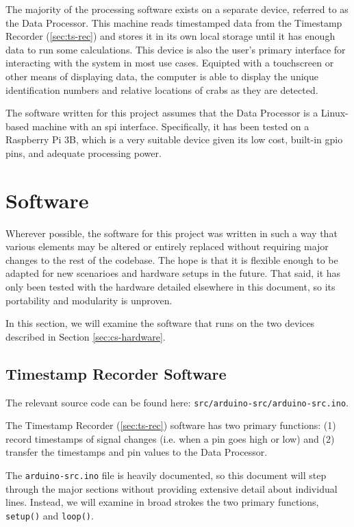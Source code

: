 \documentclass[12pt]{article}
\begin{document}
The majority of the processing software exists on a separate device, referred
to as the Data Processor.
This machine reads timestamped data from the
Timestamp Recorder (\ref{sec:ts-rec}) and stores it in its own local storage
until it has enough data to run some calculations.
This device is also the user's primary interface for interacting with the
system in most use cases.
Equipted with a touchscreen or other means of displaying data, the computer is
able to display the unique identification numbers and relative locations of
crabs as they are detected.

The software written for this project assumes that the Data Processor is a
Linux-based machine with an \gls{spi} interface.
Specifically, it has been tested on a Raspberry Pi 3B, which is a very
suitable device given its low cost, built-in \gls{gpio} pins, and adequate
processing power.

\section{Software}\label{sec:software}

Wherever possible, the software for this project was written in such a way that
various elements may be altered or entirely replaced without requiring major
changes to the rest of the codebase.
The hope is that it is flexible enough to be adapted for new scenarioes and
hardware setups in the future.
That said, it has only been tested with the hardware detailed elsewhere in this
document, so its portability and modularity is unproven.

In this section, we will examine the software that runs on the two devices
described in Section \ref{sec:cs-hardware}.

\subsection{Timestamp Recorder Software}\label{sec:ts-rec-sw}

The relevant source code can be found here:
\texttt{src/arduino-src/arduino-src.ino}.

The Timestamp Recorder (\ref{sec:ts-rec}) software has two primary functions:
(1) record timestamps of signal changes (i.e. when a pin goes high or low) and
(2) transfer the timestamps and pin values to the Data Processor.

The \texttt{arduino-src.ino} file is heavily documented, so this document
will step through the major sections without providing extensive detail about
individual lines.
Instead, we will examine in broad strokes the two primary functions,
\texttt{setup()} and \texttt{loop()}.
\end{document}
